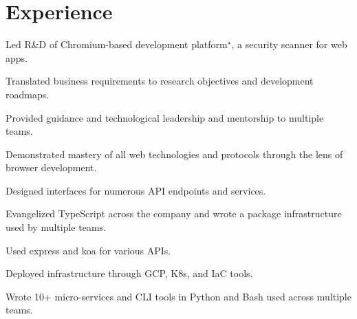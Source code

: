 \documentclass[a4paper,11pt]{article}
\begin{document}
\header%
\tagline%

\section{Experience}
\begin{sectionList}
 
    \begin{jobReflectizLead}
        \item Led R\&D of Chromium-based development platform$^\star$, a security scanner for web apps.
        \item Translated business requirements to research objectives and development roadmaps.
        \item Provided guidance and technological leadership and mentorship to multiple teams.
        \item Demonstrated mastery of all web technologies and protocols through the lens of browser development.
        \item Designed interfaces for numerous API endpoints and services.
        \item Evangelized TypeScript across the company and wrote a package infrastructure used by multiple teams.
        \item Used express and koa for various APIs.
        \item Deployed infrastructure through GCP, K8s, and IaC tools.
        \item Wrote 10+ micro-services and CLI tools in Python and Bash used across multiple teams. 
        



\end{jobReflectizLead}
\end{sectionList}
\end{document}
